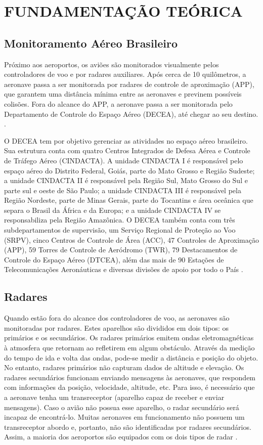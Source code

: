 \section{FUNDAMENTAÇÃO TEÓRICA}

\subsection{Monitoramento Aéreo Brasileiro}

Próximo aos aeroportos, os aviões são monitorados visualmente pelos controladores de voo e por radares auxiliares. Após cerca de 10 quilômetros, a aeronave passa a ser monitorada por radares de controle de aproximação (APP), que garantem uma distância mínima entre as aeronaves e previnem possíveis colisões. Fora do alcance do APP, a aeronave passa a ser monitorada pelo Departamento de Controle do Espaço Aéreo (DECEA), até chegar ao seu destino. \cite{decea}.

O DECEA tem por objetivo gerenciar as atividades no espaço aéreo brasileiro. Sua estrutura conta com quatro Centros Integrados de Defesa Aérea e Controle de Tráfego Aéreo (CINDACTA). A unidade CINDACTA I é responsável pelo espaço aéreo do Distrito Federal, Goiás, parte do Mato Grosso e Região Sudeste; a unidade CINDACTA II é responsável pela Região Sul, Mato Grosso do Sul e parte sul e oeste de São Paulo; a unidade CINDACTA III é responsável pela Região Nordeste, parte de Minas Gerais, parte do Tocantins e área oceânica que separa o Brasil da África e da Europa; e a unidade CINDACTA IV se responsabiliza pela Região Amazônica. O DECEA também conta com três subdepartamentos de supervisão, um Serviço Regional de Proteção ao Voo (SRPV), cinco Centros de Controle de Área (ACC), 47 Controles de Aproximação (APP), 59 Torres de Controle de Aeródromo (TWR), 79 Destacamentos de Controle do Espaço Aéreo (DTCEA), além das mais de 90 Estações de Telecomunicações Aeronáuticas e diversas divisões de apoio por todo o País \cite{decea}.

\subsection{Radares}

Quando estão fora do alcance dos controladores de voo, as aeronaves são monitoradas por radares. Estes aparelhos são divididos em dois tipos: os primários e os secundários. Os radares primários emitem ondas eletromagnéticas à atmosfera que retornam ao refletirem em algum obstáculo. Através da medição do tempo de ida e volta das ondas, pode-se medir a distância e posição do objeto. No entanto, radares primários não capturam dados de altitude e elevação. Os radares secundários funcionam enviando mensagens às aeronaves, que respondem com informações da posição, velocidade, altitude, etc. Para isso, é necessário que a aeronave tenha um transreceptor (aparelho capaz de receber e enviar mensagens). Caso o avião não possua esse aparelho, o radar secundário será incapaz de encontrá-lo. Muitas aeronaves em funcionamento não possuem um transreceptor abordo e, portanto, não são identificadas por radares secundários. Assim, a maioria dos aeroportos são equipados com os dois tipos de radar \cite{tecmundo}.

